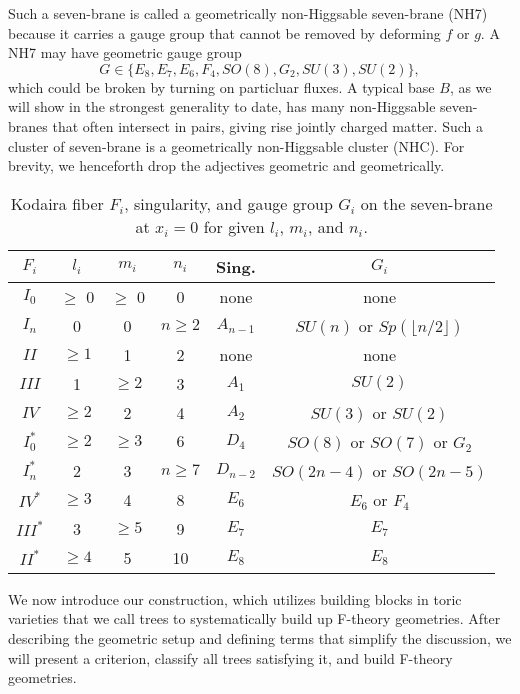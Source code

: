 \documentclass[aps,prl,twocolumn, superscriptaddress,groupedaddress,nofootinbib]{revtex4-1}
\def\ge{E}
\def\gso{SO}
\def\gsu{SU}
\def\gsp{Sp}
\def\gf{F}
\def\gg{G}
\begin{document}
Such a seven-brane is called a geometrically non-Higgsable
seven-brane (NH7) because it carries a gauge group that cannot
be removed by deforming $f$ or $g$. A NH7 may have geometric gauge group
\begin{equation}
G\in \{E_8,E_7,E_6,F_4,SO(8),G_2,SU(3),SU(2)\},
\end{equation} 
which could be broken by turning on particluar fluxes. 
A typical base $B$, as
we will show in the strongest generality to date, has many non-Higgsable seven-branes
that often intersect in pairs, giving rise jointly charged
matter. Such a cluster of seven-brane is a
geometrically 
non-Higgsable cluster (NHC). For brevity, we henceforth drop the adjectives
geometric and geometrically.



\begin{table}[t]
\begin{tabular}{|c|c|c|c|c|c|}
\hline
$F_i$ & $l_i$ & $m_i$ & $n_i$ & Sing. & $G_i$ \\ \hline \hline
$I_0$&$\geq $ 0 & $\geq $ 0 & 0 & none & none \\
$I_n$ &0 & 0 & $n \geq 2$ & $A_{n-1}$ & $\gsu(n)$  or $\gsp(\lfloor
n/2\rfloor)$\\
$II$ & $\geq 1$ & 1 & 2 & none & none \\
$III$ &1 & $\geq 2$ &3 & $A_1$ & $\gsu(2)$ \\
$IV$ & $\geq 2$ & 2 & 4 & $A_2$ & $\gsu(3)$  or $\gsu(2)$\\
$I_0^*$&
$\geq 2$ & $\geq 3$ & $6$ &$D_{4}$ & $\gso(8)$ or $\gso(7)$ or $\gg_2$ \\
$I_n^*$&
2 & 3 & $n \geq 7$ & $D_{n -2}$ & $\gso(2n-4)$  or $\gso(2n -5)$ \\
$IV^*$& $\geq 3$ & 4 & 8 & $E_6$ & $\ge_6$  or $\gf_4$\\
$III^*$&3 & $\geq 5$ & 9 & $E_7$ & $\ge_7$ \\
$II^*$& $\geq 4$ & 5 & 10 & $E_8$ & $\ge_8$ \\ \hline
\end{tabular}
\caption{Kodaira fiber $F_i$, singularity, and gauge group $G_i$ on
the seven-brane at $x_i=0$ for given $l_i$, $m_i$, and $n_i$.}
\label{tab:gauge}
\end{table}

\vspace{.2cm}

We now introduce our construction, which utilizes
building blocks in toric varieties that we call trees to systematically
build up F-theory geometries. After describing the geometric setup
and defining terms that simplify the discussion, we will present a criterion,
classify all trees satisfying it, and build F-theory geometries.
\end{document}
